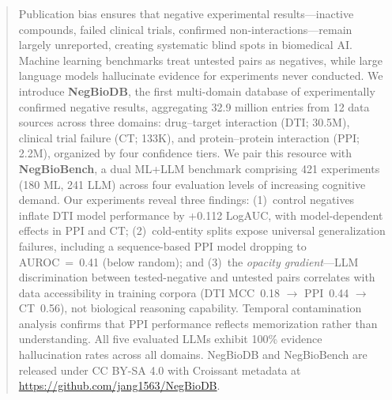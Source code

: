 \begin{abstract}
Publication bias ensures that negative experimental results---inactive compounds, failed clinical trials, confirmed non-interactions---remain largely unreported, creating systematic blind spots in biomedical AI. Machine learning benchmarks treat untested pairs as negatives, while large language models hallucinate evidence for experiments never conducted. We introduce \textbf{NegBioDB}, the first multi-domain database of experimentally confirmed negative results, aggregating 32.9 million entries from 12 data sources across three domains: drug--target interaction (DTI; 30.5M), clinical trial failure (CT; 133K), and protein--protein interaction (PPI; 2.2M), organized by four confidence tiers. We pair this resource with \textbf{NegBioBench}, a dual ML+LLM benchmark comprising 421 experiments (180 ML, 241 LLM) across four evaluation levels of increasing cognitive demand. Our experiments reveal three findings: (1)~control negatives inflate DTI model performance by +0.112 LogAUC, with model-dependent effects in PPI and CT; (2)~cold-entity splits expose universal generalization failures, including a sequence-based PPI model dropping to AUROC~=~0.41 (below random); and (3)~the \emph{opacity gradient}---LLM discrimination between tested-negative and untested pairs correlates with data accessibility in training corpora (DTI MCC~0.18 $\to$ PPI~0.44 $\to$ CT~0.56), not biological reasoning capability. Temporal contamination analysis confirms that PPI performance reflects memorization rather than understanding. All five evaluated LLMs exhibit 100\% evidence hallucination rates across all domains. NegBioDB and NegBioBench are released under CC BY-SA 4.0 with Croissant metadata at \url{https://github.com/jang1563/NegBioDB}.
\end{abstract}
